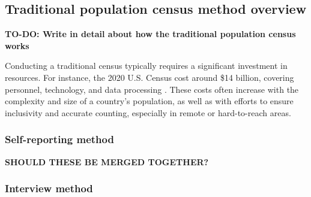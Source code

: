 \subsection{Traditional population census method overview}
\textbf{TO-DO: Write in detail about how the traditional population census works}

Conducting a traditional census typically requires a significant investment in resources. For instance, the 2020 U.S. Census cost around \$14 billion, covering personnel, technology, and data processing \cite{UsaCensusCost}. These costs often increase with the complexity and size of a country's population, as well as with efforts to ensure inclusivity and accurate counting, especially in remote or hard-to-reach areas.

\subsubsection{Self-reporting method}
\textbf{SHOULD THESE BE MERGED TOGETHER?}
\subsubsection{Interview method}